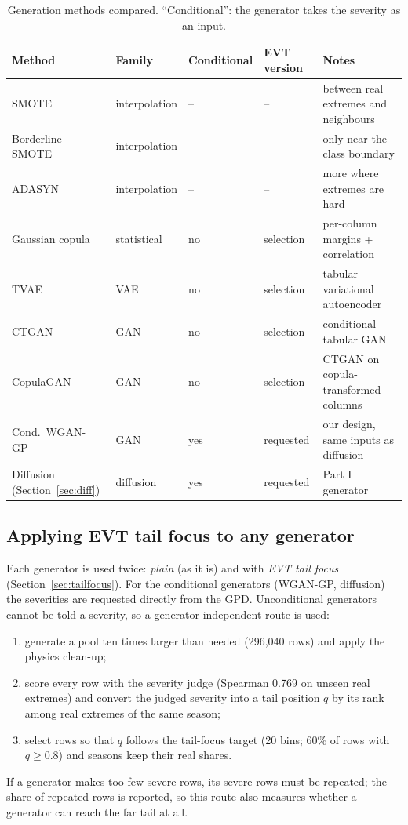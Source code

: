 \documentclass[11pt,a4paper]{article}
\begin{document}
\begin{table}[H]
\centering\small
\caption{Generation methods compared. ``Conditional'': the generator takes the severity as an input.}
\label{tab:methods}
\begin{tabular}{@{}llllp{5.0cm}@{}}
\toprule
Method & Family & Conditional & EVT version & Notes\\
\midrule
SMOTE~\cite{chawla2002smote} & interpolation & -- & -- & between real extremes and neighbours\\
Borderline-SMOTE~\cite{han2005borderline} & interpolation & -- & -- & only near the class boundary\\
ADASYN~\cite{he2008adasyn} & interpolation & -- & -- & more where extremes are hard\\
Gaussian copula~\cite{patki2016sdv} & statistical & no & selection & per-column margins + correlation\\
TVAE~\cite{xu2019ctgan} & VAE & no & selection & tabular variational autoencoder\\
CTGAN~\cite{xu2019ctgan} & GAN & no & selection & conditional tabular GAN\\
CopulaGAN~\cite{patki2016sdv} & GAN & no & selection & CTGAN on copula-transformed columns\\
Cond.\ WGAN-GP~\cite{gulrajani2017wgangp} & GAN & yes & requested & our design, same inputs as diffusion\\
Diffusion (Section~\ref{sec:diff}) & diffusion & yes & requested & Part I generator\\
\bottomrule
\end{tabular}
\end{table}

\subsection{Applying EVT tail focus to any generator}
Each generator is used twice: \emph{plain} (as it is) and with \emph{EVT tail focus}
(Section~\ref{sec:tailfocus}). For the conditional generators (WGAN-GP, diffusion) the severities are requested
directly from the GPD. Unconditional generators cannot be told a severity, so a generator-independent route is
used:
\begin{enumerate}
  \item generate a pool ten times larger than needed (296{,}040 rows) and apply the physics clean-up;
  \item score every row with the severity judge (Spearman 0.769 on unseen real extremes) and convert the
        judged severity into a tail position $q$ by its rank among real extremes of the same season;
  \item select rows so that $q$ follows the tail-focus target (20 bins; 60\% of rows with $q\ge0.8$) and
        seasons keep their real shares.
\end{enumerate}
If a generator makes too few severe rows, its severe rows must be repeated; the share of repeated rows is
reported, so this route also measures whether a generator can reach the far tail at all.
\end{document}
